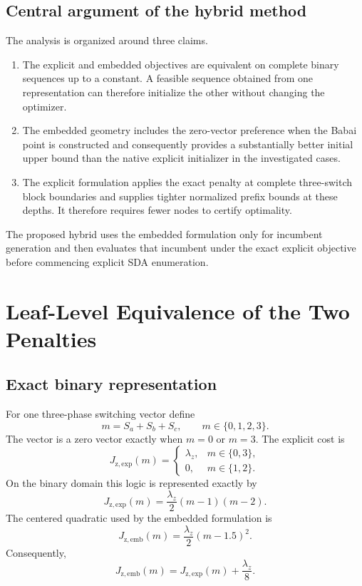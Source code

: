 \documentclass[paper=a4,oneside,fontsize=12pt,DIV=14,headings=normal,parskip=half,headsepline,numbers=noendperiod]{scrreprt}
\begin{document}
\section{Central argument of the hybrid method}
The analysis is organized around three claims.
\begin{enumerate}
 \item The explicit and embedded objectives are equivalent on complete binary
 sequences up to a constant.  A feasible sequence obtained from one
 representation can therefore initialize the other without changing the
 optimizer.
 \item The embedded geometry includes the zero-vector preference when the
 Babai point is constructed and consequently provides a substantially better
 initial upper bound than the native explicit initializer in the investigated
 cases.
 \item The explicit formulation applies the exact penalty at complete
 three-switch block boundaries and supplies tighter normalized prefix bounds
 at these depths.  It therefore requires fewer nodes to certify optimality.
\end{enumerate}
The proposed hybrid uses the embedded formulation only for incumbent
generation and then evaluates that incumbent under the exact explicit
objective before commencing explicit SDA enumeration.

\chapter{Leaf-Level Equivalence of the Two Penalties}

\section{Exact binary representation}
For one three-phase switching vector define
\begin{equation}
 m=S_a+S_b+S_c,\qquad m\in\{0,1,2,3\}.
\end{equation}
The vector is a zero vector exactly when $m=0$ or $m=3$.  The explicit cost is
\begin{equation}
 J_{\mathrm{z,exp}}(m)=
 \begin{cases}
  \lambda_z,&m\in\{0,3\},\\
  0,&m\in\{1,2\}.
 \end{cases}
\end{equation}
On the binary domain this logic is represented exactly by
\begin{equation}
 J_{\mathrm{z,exp}}(m)
 =\frac{\lambda_z}{2}(m-1)(m-2).
\end{equation}
The centered quadratic used by the embedded formulation is
\begin{equation}
 J_{\mathrm{z,emb}}(m)=\frac{\lambda_z}{2}(m-1.5)^2.
\end{equation}
Consequently,
\begin{equation}
 \boxed{J_{\mathrm{z,emb}}(m)
 =J_{\mathrm{z,exp}}(m)+\frac{\lambda_z}{8}.}
 \label{eq:block_offset}
\end{equation}
\end{document}
